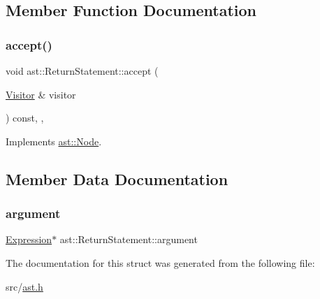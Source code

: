 \subsection{Member Function Documentation}
\mbox{\label{structast_1_1_return_statement_a88610e7417b6182f2c6d91ae37fa851e}} 
\subsubsection{\texorpdfstring{accept()}{accept()}}
{\footnotesize\ttfamily void ast\+::\+Return\+Statement\+::accept (\begin{DoxyParamCaption}\item[{\hyperlink{structast_1_1_visitor}{Visitor} \&}]{visitor }\end{DoxyParamCaption}) const\hspace{0.3cm}{\ttfamily [inline]}, {\ttfamily [override]}, {\ttfamily [virtual]}}



Implements \hyperlink{structast_1_1_node_abc089ee6caaf06a4445ebdd8391fdebc}{ast\+::\+Node}.



\subsection{Member Data Documentation}
\mbox{\label{structast_1_1_return_statement_abf5147461b105e889dc9e8726791cbf4}} 
\subsubsection{\texorpdfstring{argument}{argument}}
{\footnotesize\ttfamily \hyperlink{structast_1_1_expression}{Expression}$\ast$ ast\+::\+Return\+Statement\+::argument}



The documentation for this struct was generated from the following file\+:\begin{DoxyCompactItemize}
\item 
src/\hyperlink{ast_8h}{ast.\+h}\end{DoxyCompactItemize}
